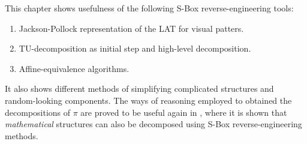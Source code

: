 This chapter shows usefulness of the following S-Box reverse-engineering tools:
\begin{enumerate}
    \item Jackson-Pollock representation of the LAT for visual patters.
    \item TU-decomposition as initial step and high-level decomposition.
    \item Affine-equivalence algorithms.
\end{enumerate}
It also shows different methods of simplifying complicated structures and random-looking components. The ways of reasoning employed to obtained the decompositions of $\pi$ are proved to be useful again in , where it is shown that \emph{mathematical} structures can also be decomposed using S-Box reverse-engineering methods. 
